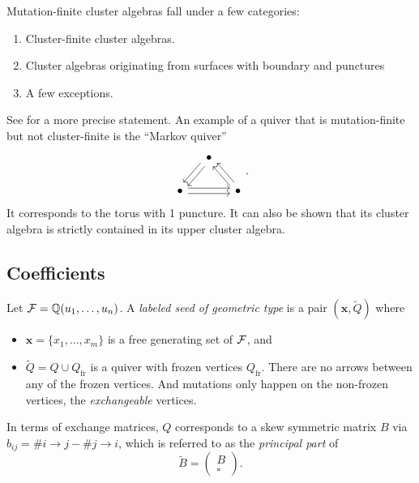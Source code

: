\documentclass{article}
\begin{document}
Mutation-finite cluster algebras fall under a few categories:
\begin{enumerate}
	\item Cluster-finite cluster algebras.
	\item Cluster algebras originating from surfaces with boundary and punctures
	\item A few exceptions.
\end{enumerate}
See \cite[Theorem 1.10]{FeliksonPavel2023cluster} for a more precise statement.
An example of a quiver that is mutation-finite but not cluster-finite is the ``Markov quiver''
\begin{equation*}
	\begin{tikzcd}[column sep= small]
		& \bullet \ar[ld, shift left] \ar[ld, shift right]\\
		\bullet \ar[rr, shift left] \ar[rr, shift right] && \bullet \ar[lu, shift left] \ar[lu, shift right]
	\end{tikzcd}.
\end{equation*}
It corresponds to the torus with 1 puncture.
It can also be shown that its cluster algebra is strictly contained in its upper cluster algebra.

\subsection{Coefficients}

Let $\mathcal{F} = \mathbb{Q}(u_1, \dots, u_n)$. A \emph{labeled seed of geometric type} is a pair
$(\mathbf{x}, \tilde{Q})$ where
\begin{itemize}
	\item $\mathbf{x} = \{x_1, \dots, x_m\}$ is a free generating set of $\mathcal{F}$, and
	\item $\tilde{Q} = Q \cup Q_{\text{fr}}$ is a quiver with frozen vertices $Q_{\text{fr}}$.
	      There are no arrows between any of the frozen vertices. And mutations only happen
	      on the non-frozen vertices, the \emph{exchangeable} vertices.
\end{itemize}
In terms of exchange matrices, $Q$ corresponds to a skew symmetric matrix $B$ via
$b_{ij} = \# i \to j - \# j \to i$, which is referred to as the \emph{principal part} of
\begin{equation*}
	\tilde{B} =
	\begin{pmatrix}
		B \\
		\square
	\end{pmatrix}.
\end{equation*}
\end{document}
